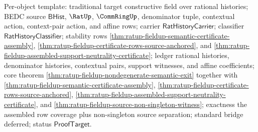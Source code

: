 Per-object template: traditional target constructive field over rational
histories; BEDC source $\mathsf{BHist}$, $\RatUp$, $\CommRingUp$, denominator
tuple, contextual action, context-pair action, and affine rows; carrier
$\mathsf{RatHistoryCarrier}$; classifier $\mathsf{RatHistoryClassifier}$;
stability rows
\autoref{thm:ratup-fieldup-semantic-certificate-assembly},
\autoref{thm:ratup-fieldup-certificate-rows-source-anchored}, and
\autoref{thm:ratup-fieldup-assembled-support-neutrality-certificate}; ledger
rational histories, denominator histories, contextual pairs, support witnesses,
and affine coefficients; core theorem
\autoref{thm:ratup-fieldup-nondegenerate-semantic-exit} together with
\autoref{thm:ratup-fieldup-semantic-certificate-assembly},
\autoref{thm:ratup-fieldup-certificate-rows-source-anchored},
\autoref{thm:ratup-fieldup-assembled-support-neutrality-certificate}, and
\autoref{thm:ratup-fieldup-source-non-singleton-witness}; exactness the
assembled row coverage plus non-singleton source separation; standard bridge
deferred; status $\mathsf{ProofTarget}$.


